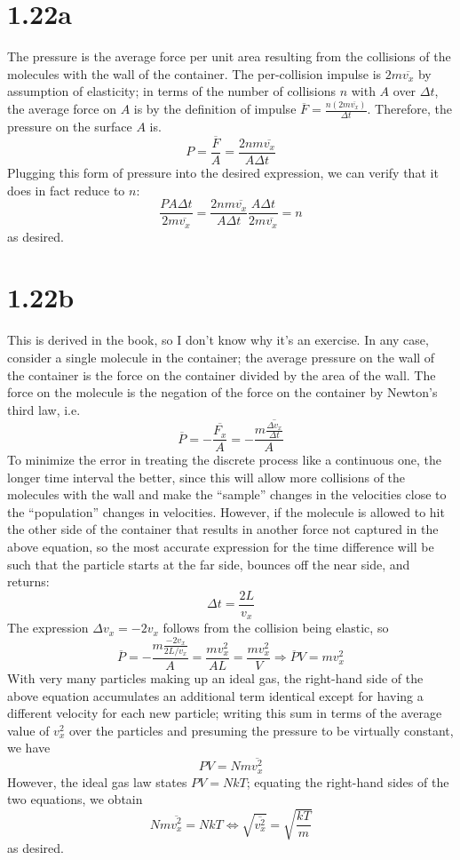 \documentclass{article}
\begin{document}
\section*{1.22a}
The pressure is the average force per unit area resulting from the collisions of the molecules with the wall of the container. The per-collision impulse is $2m\overline{v_x}$ by assumption of elasticity; in terms of the number of collisions $n$ with $A$ over $\Delta t$, the average force on $A$ is by the definition of impulse $\overline{F}=\frac{n(2m\overline{v_x})}{\Delta t}$. Therefore, the pressure on the surface $A$ is.
\[P=\frac{\overline{F}}{A}=\frac{2nm\overline{v_x}}{A\Delta t}\]
Plugging this form of pressure into the desired expression, we can verify that it does in fact reduce to $n$:
\[\frac{PA\Delta t}{2m\overline{v_x}}=\frac{2nm\overline{v_x}}{A\Delta t}\frac{A\Delta t}{2m\overline{v_x}}=n\]
as desired.

\section*{1.22b}
This is derived in the book, so I don't know why it's an exercise. In any case, consider a single molecule in the container; the average pressure on the wall of the container is the force on the container divided by the area of the wall. The force on the molecule is the negation of the force on the container by Newton's third law, i.e.
\[\overline{P}=-\frac{\overline{F_x}}{A}=-\frac{m\overline{\frac{\Delta v_x}{\Delta t}}}{A}\]
To minimize the error in treating the discrete process like a continuous one, the longer time interval the better, since this will allow more collisions of the molecules with the wall and make the ``sample'' changes in the velocities close to the ``population'' changes in velocities. However, if the molecule is allowed to hit the other side of the container that results in another force not captured in the above equation, so the most accurate expression for the time difference will be such that the particle starts at the far side, bounces off the near side, and returns:
\[\Delta t=\frac{2L}{v_x}\]
The expression  $\Delta v_x=-2v_x$ follows from the collision being elastic, so
\[\overline{P}=-\frac{m\frac{-2v_x}{2L/v_x}}{A}=\frac{mv_x^2}{AL}=\frac{mv_x^2}{V}\Rightarrow \overline{P}{V}=mv_x^2\]
With very many particles making up an ideal gas, the right-hand side of the above equation accumulates an additional term identical except for having a different velocity for each new particle; writing this sum in terms of the average value of $v_x^2$ over the particles and presuming the pressure to be virtually constant, we have
\[PV=Nm\overline{v_x^2}\]
However, the ideal gas law states $PV=NkT$; equating the right-hand sides of the two equations, we obtain
\[Nm\overline{v_x^2}=NkT\Leftrightarrow \sqrt{\overline{v_x^2}}=\sqrt{\frac{kT}{m}}\]
as desired.
\end{document}
